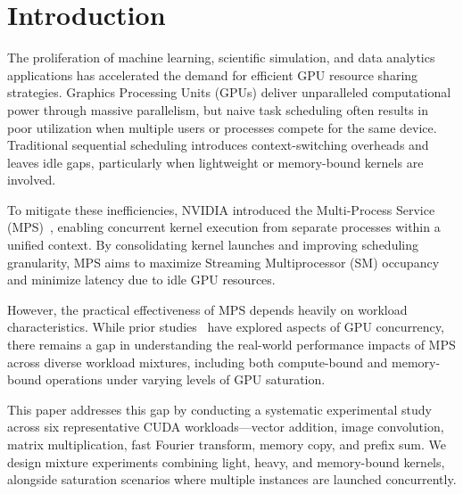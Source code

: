 \documentclass[sigconf,nonacm]{acmart}
\begin{document}


\maketitle

\section{Introduction}
The proliferation of machine learning, scientific simulation, and data analytics applications has accelerated the demand for efficient GPU resource sharing strategies. Graphics Processing Units (GPUs) deliver unparalleled computational power through massive parallelism, but naive task scheduling often results in poor utilization when multiple users or processes compete for the same device. Traditional sequential scheduling introduces context-switching overheads and leaves idle gaps, particularly when lightweight or memory-bound kernels are involved.

To mitigate these inefficiencies, NVIDIA introduced the Multi-Process Service (MPS)~\cite{nvidia_mps}, enabling concurrent kernel execution from separate processes within a unified context. By consolidating kernel launches and improving scheduling granularity, MPS aims to maximize Streaming Multiprocessor (SM) occupancy and minimize latency due to idle GPU resources.

However, the practical effectiveness of MPS depends heavily on workload characteristics. While prior studies~\cite{fang2011gpu,xu2016warped,mukherjee2015characterizing} have explored aspects of GPU concurrency, there remains a gap in understanding the real-world performance impacts of MPS across diverse workload mixtures, including both compute-bound and memory-bound operations under varying levels of GPU saturation.

This paper addresses this gap by conducting a systematic experimental study across six representative CUDA workloads—vector addition, image convolution, matrix multiplication, fast Fourier transform, memory copy, and prefix sum. We design mixture experiments combining light, heavy, and memory-bound kernels, alongside saturation scenarios where multiple instances are launched concurrently.
\end{document}
